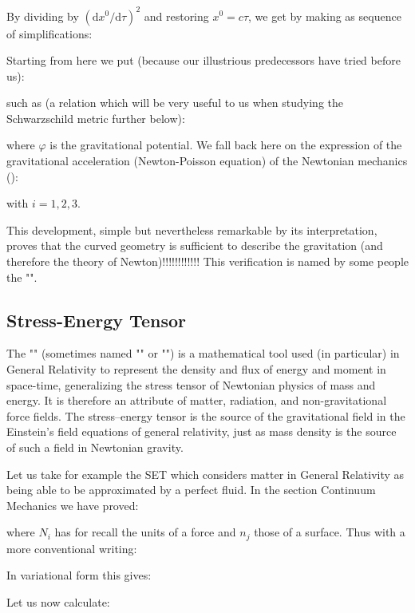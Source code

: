 	By dividing by $(\mathrm{d}x^0/\mathrm{d}\tau)^2$ and restoring $x^0=c\tau$, we get by making as sequence of simplifications:
	
	Starting from here we put (because our illustrious predecessors have tried before us):
	
	such as (a relation which will be very useful to us when studying the Schwarzschild metric further below):
	
	where $\varphi$ is the gravitational potential. We fall back here on the expression of the gravitational acceleration (Newton-Poisson equation) of the Newtonian mechanics ():
	
	with $i=1,2,3$.

	This development, simple but nevertheless remarkable by its interpretation, proves that the curved geometry is sufficient to describe the gravitation (and therefore the theory of Newton)!!!!!!!!!!!! This verification is named by some people the "".
	
	\subsection{Stress-Energy Tensor}
	The "" (sometimes named "" or "") is a mathematical tool used (in particular) in General Relativity to represent the density and flux of energy and moment in space-time, generalizing the stress tensor of Newtonian physics of mass and energy. It is therefore an attribute of matter, radiation, and non-gravitational force fields. The stress–energy tensor is the source of the gravitational field in the Einstein's field equations of general relativity, just as mass density is the source of such a field in Newtonian gravity.
	
	Let us take for example the SET which considers matter in General Relativity as being able to be approximated by a perfect fluid. In the section Continuum Mechanics we have proved:
	
	where $N_i$ has for recall the units of a force and $n_j$ those of a surface. Thus with a more conventional writing:
	
	In variational form this gives:
	
	Let us now calculate:
	
